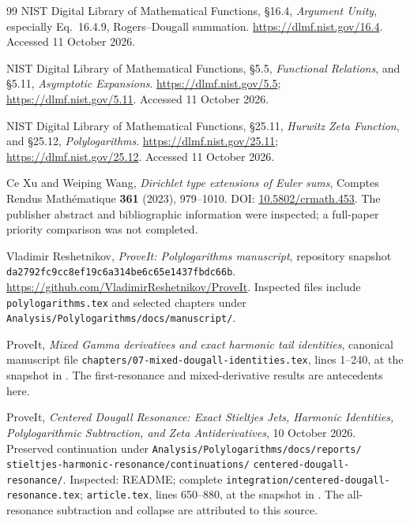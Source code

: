 \documentclass[11pt,a4paper]{article}
\numberwithin{equation}{section}
\theoremstyle{definition}\newtheorem{definition}[theorem]{Definition}
\theoremstyle{remark}\newtheorem{remark}[theorem]{Remark}
\newcommand{\pin}{\texttt{da2792fc9cc8ef19c6a314be6c65e1437fbdc66b}}
\begin{document}
\begin{thebibliography}{99}
NIST Digital Library of Mathematical Functions, \S16.4,
\emph{Argument Unity}, especially Eq.~16.4.9, Rogers--Dougall summation.
\url{https://dlmf.nist.gov/16.4}. Accessed 11 October 2026.

NIST Digital Library of Mathematical Functions, \S5.5,
\emph{Functional Relations}, and \S5.11, \emph{Asymptotic Expansions}.
\url{https://dlmf.nist.gov/5.5}; \url{https://dlmf.nist.gov/5.11}.
Accessed 11 October 2026.

NIST Digital Library of Mathematical Functions, \S25.11,
\emph{Hurwitz Zeta Function}, and \S25.12, \emph{Polylogarithms}.
\url{https://dlmf.nist.gov/25.11}; \url{https://dlmf.nist.gov/25.12}.
Accessed 11 October 2026.

Ce Xu and Weiping Wang, \emph{Dirichlet type extensions of Euler sums},
Comptes Rendus Math\'ematique \textbf{361} (2023), 979--1010.
DOI: \href{https://doi.org/10.5802/crmath.453}{10.5802/crmath.453}.
The publisher abstract and bibliographic information were inspected;
a full-paper priority comparison was not completed.

Vladimir Reshetnikov, \emph{ProveIt: Polylogarithms manuscript},
repository snapshot \pin.
\url{https://github.com/VladimirReshetnikov/ProveIt}.
Inspected files include \texttt{polylogarithms.tex} and selected chapters
under \texttt{Analysis/Polylogarithms/docs/manuscript/}.

ProveIt, \emph{Mixed Gamma derivatives and exact harmonic tail identities},
canonical manuscript file
\texttt{chapters/07-mixed-dougall-identities.tex}, lines 1--240,
at the snapshot in \cite{repo-main}.
The first-resonance and mixed-derivative results are antecedents here.

ProveIt, \emph{Centered Dougall Resonance: Exact Stieltjes Jets,
Harmonic Identities, Polylogarithmic Subtraction, and Zeta Antiderivatives},
10 October 2026. Preserved continuation under
\texttt{Analysis/Polylogarithms/docs/reports/}\allowbreak
\texttt{stieltjes-harmonic-resonance/continuations/}\allowbreak
\texttt{centered-dougall-resonance/}.
Inspected: README; complete
\texttt{integration/centered-dougall-resonance.tex};
\texttt{article.tex}, lines 650--880, at the snapshot in \cite{repo-main}.
The all-resonance subtraction and collapse are attributed to this source.
\end{thebibliography}
\end{document}
